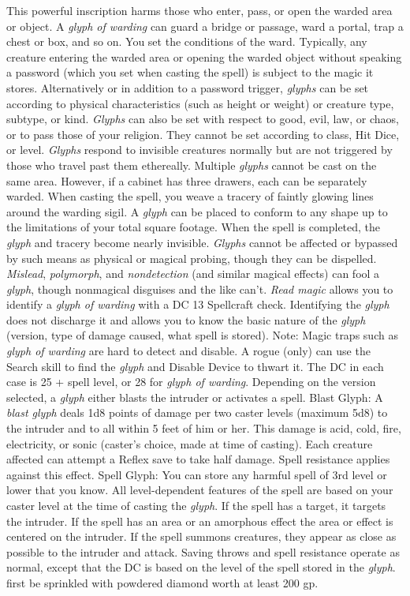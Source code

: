 This powerful inscription harms those who enter, pass, or open the warded area
or object. A \textit{glyph of warding} can guard a bridge or passage, ward a portal,
trap a chest or box, and so on.
You set the conditions of the ward. Typically, any creature entering the warded
area or opening the warded object without speaking a password (which you set when
casting the spell) is subject to the magic it stores. Alternatively or in addition
to a password trigger, \textit{glyphs} can be set according to physical characteristics
(such as height or weight) or creature type, subtype, or kind. \textit{Glyphs} can
also be set with respect to good, evil, law, or chaos, or to pass those of your
religion. They cannot be set according to class, Hit Dice, or level. \textit{Glyphs
}respond to invisible creatures normally but are not triggered by those who travel
past them ethereally. Multiple \textit{glyphs} cannot be cast on the same area.
However, if a cabinet has three drawers, each can be separately warded.
When casting the spell, you weave a tracery of faintly glowing lines around the
warding sigil. A \textit{glyph} can be placed to conform to any shape up to the
limitations of your total square footage. When the spell is completed, the \textit{glyph
}and tracery become nearly invisible.
\textit{Glyphs} cannot be affected or bypassed by such means as physical or magical
probing, though they can be dispelled. \textit{Mislead}, \textit{polymorph}, and
\textit{nondetection} (and similar magical effects) can fool a \textit{glyph},
though nonmagical disguises and the like can't. \textit{Read magic} allows you
to identify a \textit{glyph of warding} with a DC 13 Spellcraft check. Identifying
the \textit{glyph} does not discharge it and allows you to know the basic nature
of the \textit{glyph} (version, type of damage caused, what spell is stored).
Note: Magic traps such as \textit{glyph of warding} are hard to detect
and disable. A rogue (only) can use the Search skill to find the \textit{glyph
}and Disable Device to thwart it. The DC in each case is 25 + spell level, or 28
for \textit{glyph of warding}.
Depending on the version selected, a \textit{glyph} either blasts the intruder
or activates a spell.
Blast Glyph: A \textit{blast glyph} deals 1d8 points of damage per two
caster levels (maximum 5d8) to the intruder and to all within 5 feet of him or
her. This damage is acid, cold, fire, electricity, or sonic (caster's choice, made
at time of casting). Each creature affected can attempt a Reflex save to take half
damage. Spell resistance applies against this effect.
Spell Glyph: You can store any harmful spell of 3rd level or lower that
you know. All level-dependent features of the spell are based on your caster level
at the time of casting the \textit{glyph}. If the spell has a target, it targets
the intruder. If the spell has an area or an amorphous effect the area or effect
is centered on the intruder. If the spell summons creatures, they appear as close
as possible to the intruder and attack. Saving throws and spell resistance operate
as normal, except that the DC is based on the level of the spell stored in the
\textit{glyph}.
first be sprinkled with powdered diamond worth at least 200 gp.